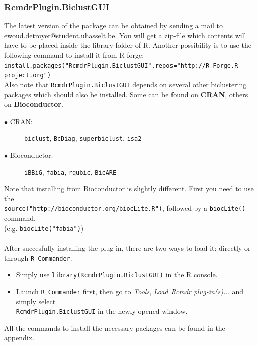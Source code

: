 \documentclass[a4paper]{article}\usepackage[]{graphicx}\usepackage[]{color}
\begin{document}
\subsubsection{RcmdrPlugin.BiclustGUI}
\noindent The latest version of the package can be obtained by sending a mail to
\href{mailto:ewoud.detroyer@uhasselt.be}{ewoud.detroyer@student.uhasselt.be}. You will get a zip-file which
contents will have to be placed inside the library folder of R. Another
possibility is to use the following command to install it from
R-forge:\\ \verb|install.packages("RcmdrPlugin.BiclustGUI",repos="http://R-Forge.R-project.org")|\\
Also note that \verb|RcmdrPlugin.BiclustGUI| depends on several other
biclustering packages which should also be installed. Some can be found on
{\bf CRAN}, others on {\bf Bioconductor}.
\begin{description}
  \item[$\bullet$ CRAN: ]\verb|biclust|, \verb|BcDiag|, \verb|superbiclust|,
  \verb|isa2|
  \item[$\bullet$ Bioconductor: ]\verb|iBBiG|, \verb|fabia|, \verb|rqubic|,
  \verb|BicARE|
\end{description}
\noindent Note that installing from Bioconductor is slightly different. First
you need to use the\\ \verb|source("http://bioconductor.org/biocLite.R")|,
followed by a \verb|biocLite()| command.\\ (e.g. \verb|biocLite("fabia")|)
\\ \\
\noindent After succesfully installing the plug-in, there are two ways to load
it: directly or through \verb|R Commander|.
\begin{itemize}
  \item Simply use \verb|library(RcmdrPlugin.BiclustGUI)| in the R console.
  \item Launch \verb|R Commander| first, then go to {\it Tools}, {\it Load Rcmdr
  plug-in(s)...} and simply select\\ \verb|RcmdrPlugin.BiclustGUI| in the newly
  opened window.
\end{itemize}
\noindent All the commands to install the necessary packages can be found in the
appendix.
\end{document}
